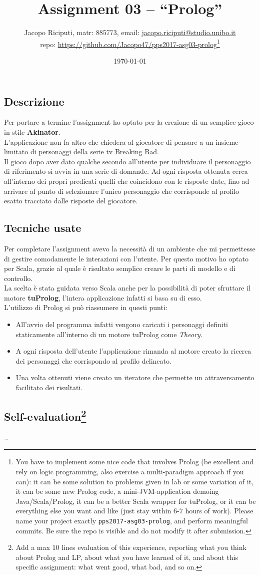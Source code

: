 \documentclass[10pt,english]{article}
\title{\vspace{-70pt}Assignment 03 -- ``Prolog''}
\author{Jacopo Riciputi, matr: 885773, email: {\url{jacopo.riciputi@studio.unibo.it}}\\ repo: {\url{https://github.com/Jacopo47/pps2017-asg03-prolog}}\footnote{You have to implement some nice code that involves Prolog (be excellent and rely on logic programming, also exercise a multi-paradigm approach if you can): it can be some solution to problems given in lab or some variation of it, it can be some new Prolog code, a mini-JVM-application demoing Java/Scala/Prolog, it can be a better Scala wrapper for tuProlog, or it can be everything else you want and like (just stay within 6-7 hours of work). Please name your project exactly \texttt{pps2017-asg03-prolog}, and perform meaningful commits. Be sure the repo is visible and do not modify it after submission.}}
\date{\today}
\begin{document}
\maketitle
\vspace{-30pt}

\subsection{Descrizione}

Per portare a termine l'assignment ho optato per la crezione di un semplice gioco in stile \textbf{Akinator}. \\
L'applicazione non fa altro che chiedera al giocatore di pensare a un insieme limitato di personaggi della serie tv Breaking Bad. \\
Il gioco dopo aver dato qualche secondo all'utente per individuare il personaggio di riferimento si avvia in una serie di domande. 
Ad ogni risposta ottenuta cerca all'interno dei propri predicati quelli che coincidono con le risposte date, fino ad arrivare al punto di selezionare l'unico personaggio che corrisponde al profilo esatto tracciato dalle risposte del giocatore.


\subsection{Tecniche usate}
Per completare l'assignment avevo la necessità di un ambiente che mi permettesse di gestire comodamente le interazioni con l'utente.
Per questo motivo ho optato per Scala, grazie al quale è risultato semplice creare le parti di modello e di controllo. \\
La scelta è stata guidata verso Scala anche per la possibilità di poter sfruttare il motore \textbf{tuProlog}, l'intera applicazione infatti si basa su di esso. \\

L'utilizzo di Prolog si può riassumere in questi punti: 
  \begin{itemize}
   \item All'avvio del programma infatti vengono caricati i personaggi definiti staticamente all'interno di un motore tuProlog come \textit{Theory}.
   \item A ogni risposta dell'utente l'applicazione rimanda al motore creato la ricerca dei personaggi che corrispondo al profilo delineato. 
   \item Una volta ottenuti viene creato un iteratore che permette un attraversamento facilitato dei risultati. 
  \end{itemize}



\subsection*{Self-evaluation\footnote{Add a max 10 lines evaluation of this experience, reporting what you think about Prolog and LP, about what you have learned of it, and about this specific assignment: what went good, what bad, and so on.}}

\ldots 
 
\end{document}
